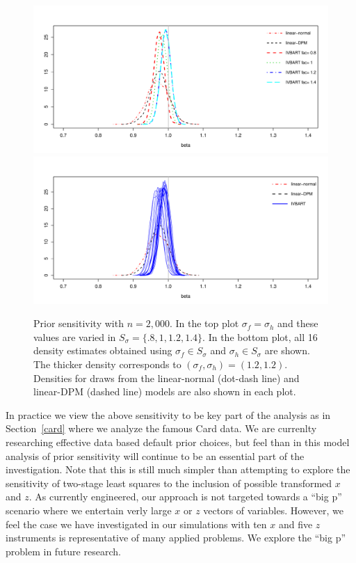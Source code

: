 \begin{figure}
\includegraphics[scale=.6]{14-11_1-2_2000_sim-prisens_1-way.pdf} \\
\includegraphics[scale=.6]{14-11_1-2_2000_sim-prisens_2-way.pdf} 
\caption{%
Prior sensitivity with $n = 2,000$.
In the top plot $\sigma_f = \sigma_h$ and these values are varied in $S_\sigma = \{.8,1,1.2,1.4\}$.
In the bottom plot, all 16 density estimates obtained using $\sigma_f \in S_\sigma$ and $\sigma_h \in S_\sigma$
are shown.
The thicker density corresponds to $(\sigma_f,\sigma_h) = (1.2, 1.2)$.
Densities for draws from the linear-normal (dot-dash line) and linear-DPM (dashed line) models are also shown in each plot.
\label{fig:sim-prisens-2000}}
\end{figure}

In practice we view the above sensitivity to be key part of the analysis as in Section~\ref{card} where
we analyze the famous Card data.
We are currenlty researching effective data based default prior choices, but feel than in this model
analysis of prior sensitivity will continue to be an essential part of the investigation.
Note that this is still much simpler than attempting to explore the sensitivity of two-stage least
squares to the inclusion of possible transformed $x$ and $z$.
As currently engineered, our approach is not targeted towards a ``big p'' scenario where we entertain
verly large $x$ or $z$ vectors of variables.
However, we feel the case we have investigated in our simulations with ten $x$ and five $z$ instruments 
is representative of many applied problems.
We explore the ``big p'' problem in future research.

